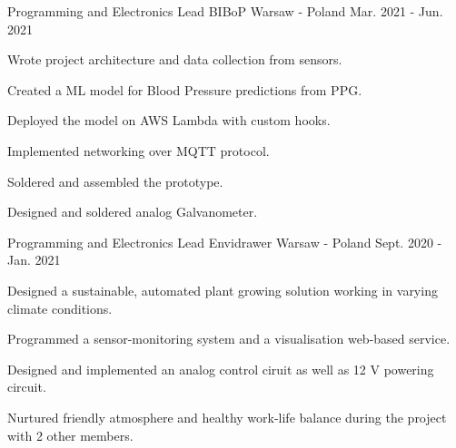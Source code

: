 

\begin{cventries}

    \cventry
    {Programming and Electronics Lead} %
    {BIBoP} %
    {Warsaw - Poland} %
    {Mar. 2021 - Jun. 2021} %
    {
      \begin{cvitems} %
        \item { Wrote project architecture and data collection from sensors. }
        \item { Created a ML model for Blood Pressure predictions from PPG. }
        \item { Deployed the model on AWS Lambda with custom hooks. }
        \item { Implemented networking over MQTT protocol. }
        \item { Soldered and assembled the prototype. }
        \item { Designed and soldered analog Galvanometer. }
      \end{cvitems}
    }

    \cventry
    {Programming and Electronics Lead} %
    {Envidrawer} %
    {Warsaw - Poland} %
    {Sept. 2020 - Jan. 2021} %
    {
      \begin{cvitems} %
        \item {Designed a sustainable, automated plant growing solution working in varying climate conditions.}
        \item {Programmed a sensor-monitoring system and a visualisation web-based service.}
        \item {Designed and implemented an analog control ciruit as well as 12 V powering circuit.}
        \item {Nurtured friendly atmosphere and healthy work-life balance during the project with 2 other members.}
      \end{cvitems}
    }


\end{cventries}
